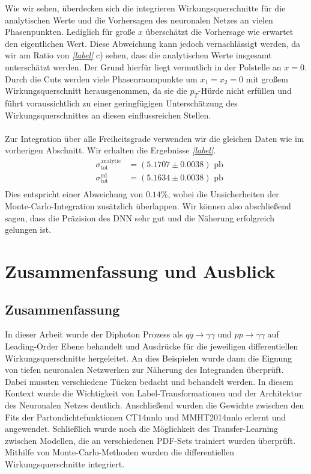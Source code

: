 Wie wir sehen, überdecken sich die integrieren Wirkungsquerschnitte für die analytischen Werte und die Vorhersagen des neuronalen Netzes an vielen Phasenpunkten. Lediglich für große $x$ überschätzt die Vorhersage wie erwartet den eigentlichen Wert. Diese Abweichung kann jedoch vernachlässigt werden, da wir am Ratio von \textit{\autoref{label}} c) sehen, dass die analytischen Werte insgesamt unterschätzt werden. Der Grund hierfür liegt vermutlich in der Polstelle an $x=0$. Durch die Cuts werden viele Phasenraumpunkte um $x_1 = x_2 = 0$ mit großem Wirkungsquerschnitt herausgenommen, da sie die $p_T$-Hürde nicht erfüllen und führt voraussichtlich zu einer geringfügigen Unterschätzung des Wirkungsquerschnittes an diesen einflussreichen Stellen. \\
\\
Zur Integration über alle Freiheitsgrade verwenden wir die gleichen Daten wie im vorherigen Abschnitt. Wir erhalten die Ergebnisse \textit{\autoref{label}}.
\begin{equation}
\begin{aligned}
&\sigma_{\text{tot}}^{\text{analytic}}&=  (5.1707 \pm 0.0038) \text{ pb}\\
&\sigma_{\text{tot}}^{\text{ml}} &= (5.1634 \pm 0.0038) \text{ pb} \\
\end{aligned}
\end{equation}
Dies entspricht einer Abweichung von $0.14\%$, wobei die Unsicherheiten der Monte-Carlo-Integration zusätzlich überlappen. Wir können also abschließend sagen, dass die Präzision des DNN sehr gut und die Näherung erfolgreich gelungen ist.   
\chapter{Zusammenfassung und Ausblick}
\section{Zusammenfassung}
In dieser Arbeit wurde der Diphoton Prozess als $q\overline{q} \rightarrow \gamma \gamma$ und $pp \rightarrow \gamma \gamma$ auf Leading-Order Ebene behandelt und Ausdrücke für die jeweiligen differentiellen Wirkungsquerschnitte hergeleitet. An dies Beispielen wurde dann die Eignung von tiefen neuronalen Netzwerken zur Näherung des Integranden überprüft. Dabei mussten verschiedene Tücken bedacht und behandelt werden. In diesem Kontext wurde die Wichtigkeit von Label-Transformationen und der Architektur des Neuronalen Netzes deutlich. Anschließend wurden die Gewichte zwischen den Fits der Partondichtefunktionen CT14nnlo und MMHT2014nnlo erlernt und angewendet. Schließlich wurde noch die Möglichkeit des Transfer-Learning zwischen Modellen, die an verschiedenen PDF-Sets trainiert wurden überprüft. Mithilfe von Monte-Carlo-Methoden wurden die differentiellen Wirkungsquerschnitte integriert.

